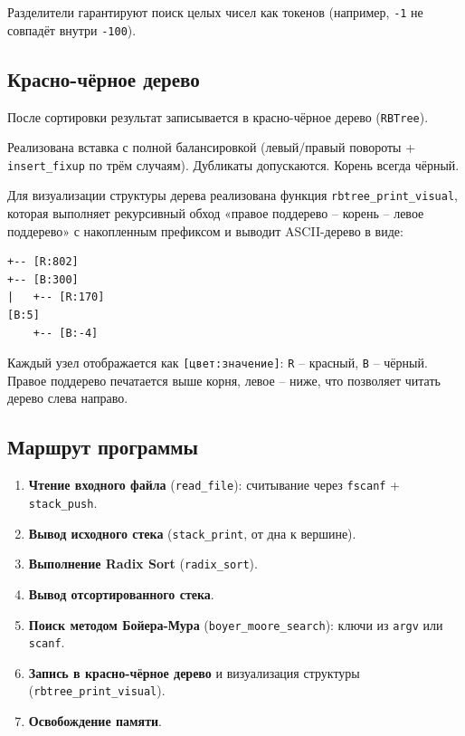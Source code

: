 \documentclass[a4paper,14pt]{extarticle}
\begin{document}
Разделители гарантируют поиск целых чисел как токенов (например, \texttt{-1} не совпадёт внутри \texttt{-100}).

\subsection{Красно-чёрное дерево}

После сортировки результат записывается в красно-чёрное дерево (\texttt{RBTree}).

Реализована вставка с полной балансировкой (левый/правый повороты + \texttt{insert\_fixup} по трём случаям). Дубликаты допускаются. Корень всегда чёрный.

Для визуализации структуры дерева реализована функция \texttt{rbtree\_print\_visual}, которая выполняет рекурсивный обход «правое поддерево -- корень -- левое поддерево» с накопленным префиксом и выводит ASCII-дерево в виде:

\begin{Verbatim}[frame=single,fontsize=\footnotesize]
    +-- [R:802]
+-- [B:300]
|   +-- [R:170]
[B:5]
    +-- [B:-4]
\end{Verbatim}

Каждый узел отображается как \texttt{[цвет:значение]}: \texttt{R} -- красный, \texttt{B} -- чёрный. Правое поддерево печатается выше корня, левое -- ниже, что позволяет читать дерево слева направо.

\subsection{Маршрут программы}

\begin{enumerate}
  \item \textbf{Чтение входного файла} (\texttt{read\_file}): считывание через \texttt{fscanf} + \texttt{stack\_push}.
  \item \textbf{Вывод исходного стека} (\texttt{stack\_print}, от дна к вершине).
  \item \textbf{Выполнение Radix Sort} (\texttt{radix\_sort}).
  \item \textbf{Вывод отсортированного стека}.
  \item \textbf{Поиск методом Бойера-Мура} (\texttt{boyer\_moore\_search}): ключи из \texttt{argv} или \texttt{scanf}.
  \item \textbf{Запись в красно-чёрное дерево} и визуализация структуры (\texttt{rbtree\_print\_visual}).
  \item \textbf{Освобождение памяти}.
\end{enumerate}
\end{document}

